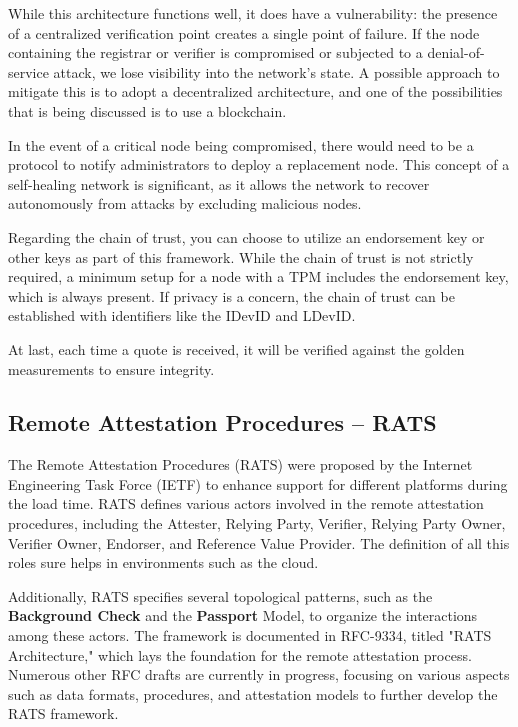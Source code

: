 While this architecture functions well, it does have a vulnerability:
the presence of a centralized verification point creates a single
point of failure. If the node containing the registrar or verifier is
compromised or subjected to a denial-of-service attack, we lose
visibility into the network's state. A possible approach to mitigate 
this is to adopt a decentralized architecture, and one of the
possibilities that is being discussed is to use a blockchain.

In the event of a critical node being compromised, there would need to
be a protocol to notify administrators to deploy a replacement node.
This concept of a self-healing network is significant, as it allows
the network to recover autonomously from attacks by excluding
malicious nodes.

Regarding the chain of trust, you can choose to utilize an endorsement
key or other keys as part of this framework. While the chain of trust
is not strictly required, a minimum setup for a node with a TPM
includes the endorsement key, which is always present. If privacy is a
concern, the chain of trust can be established with identifiers like
the IDevID and LDevID.

At last, each time a quote is received, it will be verified against
the golden measurements to ensure integrity.

\subsection{Remote Attestation Procedures – RATS}

The Remote Attestation Procedures (RATS) were proposed by the Internet
Engineering Task Force (IETF) to enhance support for different
platforms during the load time. RATS defines various actors involved
in the remote attestation procedures, including the Attester, Relying
Party, Verifier, Relying Party Owner, Verifier Owner, Endorser, and
Reference Value Provider. The definition of all this roles sure helps
in environments such as the cloud.

Additionally, RATS specifies several topological patterns, such as the
\textbf{Background Check} and the \textbf{Passport} Model, to organize
the interactions among these actors. The framework is documented in
RFC-9334, titled "RATS Architecture," which lays the foundation for
the remote attestation process. Numerous other RFC drafts are
currently in progress, focusing on various aspects such as data
formats, procedures, and attestation models to further develop the
RATS framework.

